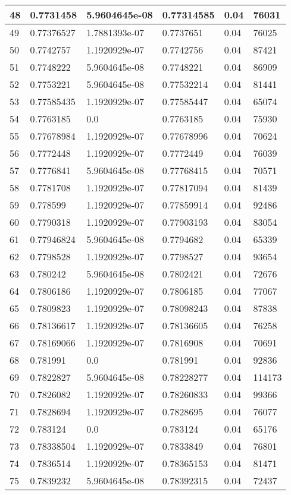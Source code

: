 \begin{longtable}{|l|l|l|l|l|l|}
48 & 0.7731458 & 5.9604645e-08 & 0.77314585 & 0.04 & 76031 \\ \hline 
49 & 0.77376527 & 1.7881393e-07 & 0.7737651 & 0.04 & 76025 \\ \hline 
50 & 0.7742757 & 1.1920929e-07 & 0.7742756 & 0.04 & 87421 \\ \hline 
51 & 0.7748222 & 5.9604645e-08 & 0.7748221 & 0.04 & 86909 \\ \hline 
52 & 0.7753221 & 5.9604645e-08 & 0.77532214 & 0.04 & 81441 \\ \hline 
53 & 0.77585435 & 1.1920929e-07 & 0.77585447 & 0.04 & 65074 \\ \hline 
54 & 0.7763185 & 0.0 & 0.7763185 & 0.04 & 75930 \\ \hline 
55 & 0.77678984 & 1.1920929e-07 & 0.77678996 & 0.04 & 70624 \\ \hline 
56 & 0.7772448 & 1.1920929e-07 & 0.7772449 & 0.04 & 76039 \\ \hline 
57 & 0.7776841 & 5.9604645e-08 & 0.77768415 & 0.04 & 70571 \\ \hline 
58 & 0.7781708 & 1.1920929e-07 & 0.77817094 & 0.04 & 81439 \\ \hline 
59 & 0.778599 & 1.1920929e-07 & 0.77859914 & 0.04 & 92486 \\ \hline 
60 & 0.7790318 & 1.1920929e-07 & 0.77903193 & 0.04 & 83054 \\ \hline 
61 & 0.77946824 & 5.9604645e-08 & 0.7794682 & 0.04 & 65339 \\ \hline 
62 & 0.7798528 & 1.1920929e-07 & 0.7798527 & 0.04 & 93654 \\ \hline 
63 & 0.780242 & 5.9604645e-08 & 0.7802421 & 0.04 & 72676 \\ \hline 
64 & 0.7806186 & 1.1920929e-07 & 0.7806185 & 0.04 & 77067 \\ \hline 
65 & 0.7809823 & 1.1920929e-07 & 0.78098243 & 0.04 & 87838 \\ \hline 
66 & 0.78136617 & 1.1920929e-07 & 0.78136605 & 0.04 & 76258 \\ \hline 
67 & 0.78169066 & 1.1920929e-07 & 0.7816908 & 0.04 & 70691 \\ \hline 
68 & 0.781991 & 0.0 & 0.781991 & 0.04 & 92836 \\ \hline 
69 & 0.7822827 & 5.9604645e-08 & 0.78228277 & 0.04 & 114173 \\ \hline 
70 & 0.7826082 & 1.1920929e-07 & 0.78260833 & 0.04 & 99366 \\ \hline 
71 & 0.7828694 & 1.1920929e-07 & 0.7828695 & 0.04 & 76077 \\ \hline 
72 & 0.783124 & 0.0 & 0.783124 & 0.04 & 65176 \\ \hline 
73 & 0.78338504 & 1.1920929e-07 & 0.7833849 & 0.04 & 76801 \\ \hline 
74 & 0.7836514 & 1.1920929e-07 & 0.78365153 & 0.04 & 81471 \\ \hline 
75 & 0.7839232 & 5.9604645e-08 & 0.78392315 & 0.04 & 72437 \\ \hline 
\end{longtable}